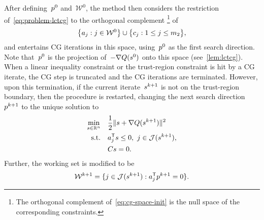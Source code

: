 After defining~$\pstep[0]$ and~$\mathcal{W}^0$, the method then considers the restriction of~\cref{eq:problem-lctcg} to the orthogonal complement
\footnote{The orthogonal complement of~\cref{eq:cg-space-init} is the null space of the corresponding constraints.}
of
\begin{equation}
    \label{eq:cg-space-init}
    \set[\big]{a_j : j \in \mathcal{W}^0} \cup \set[\big]{c_j : 1 \le j \le m_2},
\end{equation}
and entertains CG iterations in this space, using~$\pstep[0]$ as the first search direction.
Note that~$\pstep[0]$ is the projection of~$-\nabla Q(\sstep[0])$ onto this space (see~\cref{lem:lctcg}).
When a linear inequality constraint or the trust-region constraint is hit by a CG iterate, the CG
step is truncated and the CG iterations are terminated.
However, upon this termination, if the current iterate~$\sstep[k + 1]$ is not on the trust-region boundary, then the procedure is restarted, changing the next search direction~$\pstep[k + 1]$ to the unique solution to
\begin{subequations}
    \label{eq:tcg-linear-working-set-after}
    \begin{align}
        \min_{\sstep \in \R^n}  & \quad \frac{1}{2} \norm{\sstep + \nabla Q(\sstep[k + 1])}^2\\
        \text{s.t.}             & \quad a_j^{\T} \sstep \le 0, ~ j \in \mathcal{J}(\sstep[k + 1]),\\
                                & \quad C \sstep = 0.
    \end{align}
\end{subequations}
Further, the working set is modified to be
\begin{equation}
    \label{eq:tcg-linear-working-set-restart}
    \mathcal{W}^{k + 1} = \set{j \in \mathcal{J}(\sstep[k + 1]) : a_j^{\T} \pstep[k + 1] = 0}.
\end{equation}


